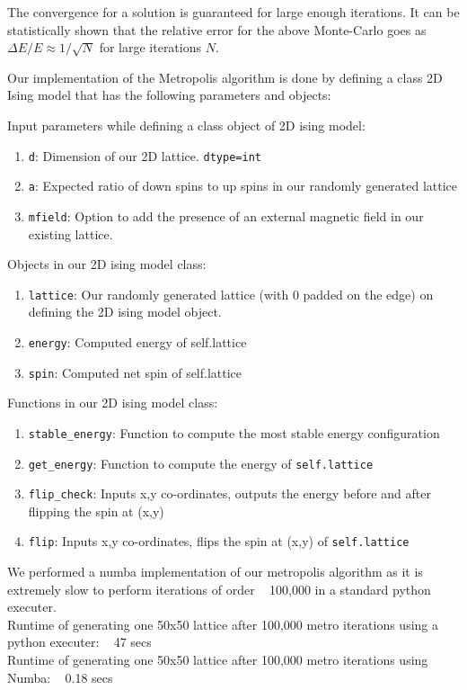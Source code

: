 The convergence for a solution is guaranteed for large enough iterations. It can be statistically shown that the relative error for the above Monte-Carlo goes as $\Delta E/E \approx 1/\sqrt{N}$ for large iterations $N$.

Our implementation of the Metropolis algorithm is done by defining a class 2D Ising model that has the following parameters and objects:

Input parameters while defining a class object of 2D ising model:
\begin{enumerate}
    \item \texttt{d}: Dimension of our 2D lattice. \texttt{dtype=int}
    \item \texttt{a}: Expected ratio of down spins to up spins in our randomly generated lattice
    \item \texttt{mfield}: Option to add the presence of an external magnetic field in our existing lattice.
\end{enumerate}

Objects in our 2D ising model class:
\begin{enumerate}
    \item \texttt{lattice}: Our randomly generated lattice (with 0 padded on the edge) on defining the 2D ising model object.
    \item \texttt{energy}: Computed energy of self.lattice
    \item \texttt{spin}: Computed net spin of self.lattice
\end{enumerate}

Functions in our 2D ising model class:
\begin{enumerate}
    \item \texttt{stable\_energy}: Function to compute the most stable energy configuration
    \item \texttt{get\_energy}: Function to compute the energy of \texttt{self.lattice}
    \item \texttt{flip\_check}: Inputs x,y co-ordinates, outputs the energy before and after flipping the spin at (x,y)
    \item \texttt{flip}: Inputs x,y co-ordinates, flips the spin at (x,y) of \texttt{self.lattice}
\end{enumerate}

We performed a numba implementation of our metropolis algorithm as it is extremely slow to perform iterations of order ~ 100,000 in a standard python executer. \\
Runtime of generating one 50x50 lattice after 100,000 metro iterations using a python executer: ~ 47 secs\\
Runtime of generating one 50x50 lattice after 100,000 metro iterations using Numba: ~ 0.18 secs

